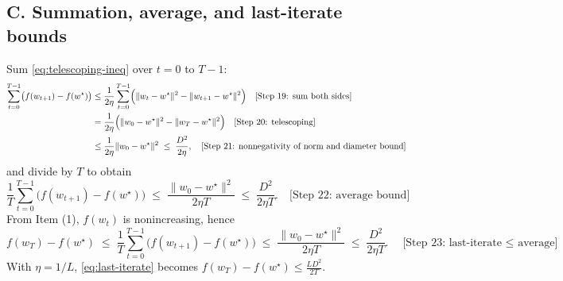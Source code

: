 \documentclass[11pt]{article}
\begin{document}
\subsection*{C. Summation, average, and last-iterate bounds}
Sum \eqref{eq:telescoping-ineq} over $t=0$ to $T-1$:
\begin{align}
\sum_{t=0}^{T-1}\bigl(f(w_{t+1})-f(w^\star)\bigr)
&\le \frac{1}{2\eta}\sum_{t=0}^{T-1}\Bigl(\|w_t - w^\star\|^2 - \|w_{t+1} - w^\star\|^2\Bigr) \quad \text{[Step 19: sum both sides]} \nonumber\\
&= \frac{1}{2\eta}\Bigl(\|w_0 - w^\star\|^2 - \|w_T - w^\star\|^2\Bigr) \quad \text{[Step 20: telescoping]} \nonumber\\
&\le \frac{1}{2\eta}\|w_0 - w^\star\|^2 \;\le\; \frac{D^2}{2\eta}, \quad \text{[Step 21: nonnegativity of norm and diameter bound]}
\label{eq:sum-gap}
\end{align}
and divide by $T$ to obtain
\begin{equation}
\frac{1}{T}\sum_{t=0}^{T-1}\bigl(f(w_{t+1})-f(w^\star)\bigr) \;\le\; \frac{\|w_0 - w^\star\|^2}{2\eta T} \;\le\; \frac{D^2}{2\eta T}. \quad \text{[Step 22: average bound]}
\label{eq:avg-gap}
\end{equation}
From Item (1), $f(w_t)$ is nonincreasing, hence
\begin{equation}
f(w_T)-f(w^\star) \;\le\; \frac{1}{T}\sum_{t=0}^{T-1}\bigl(f(w_{t+1})-f(w^\star)\bigr) \;\le\; \frac{\|w_0 - w^\star\|^2}{2\eta T} \;\le\; \frac{D^2}{2\eta T}. \quad \text{[Step 23: last-iterate $\le$ average]}
\label{eq:last-iterate}
\end{equation}
With $\eta=1/L$, \eqref{eq:last-iterate} becomes $f(w_T)-f(w^\star) \le \tfrac{L D^2}{2T}$. \quad \text{[Step 24: plug $\eta=1/L$]}
\end{document}
